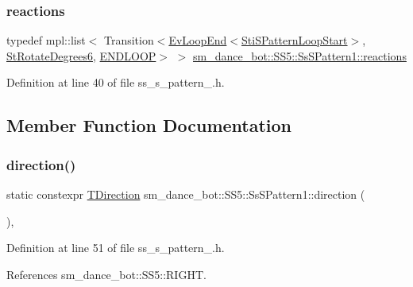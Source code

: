 \subsubsection{\texorpdfstring{reactions}{reactions}}
{\footnotesize\ttfamily typedef mpl\+::list$<$ Transition$<$\hyperlink{structsmacc_1_1default__events_1_1EvLoopEnd}{Ev\+Loop\+End}$<$\hyperlink{structsm__dance__bot_1_1s__pattern__states_1_1StiSPatternLoopStart}{Sti\+S\+Pattern\+Loop\+Start}$>$, \hyperlink{structsm__dance__bot_1_1StRotateDegrees6}{St\+Rotate\+Degrees6}, \hyperlink{structsmacc_1_1default__transition__tags_1_1ENDLOOP}{E\+N\+D\+L\+O\+OP}$>$ $>$ \hyperlink{structsm__dance__bot_1_1SS5_1_1SsSPattern1_a6c5b86a52543caf627a571c543f6eda8}{sm\+\_\+dance\+\_\+bot\+::\+S\+S5\+::\+Ss\+S\+Pattern1\+::reactions}}



Definition at line 40 of file ss\+\_\+s\+\_\+pattern\+\_.\+h.



\subsection{Member Function Documentation}
\mbox{\label{structsm__dance__bot_1_1SS5_1_1SsSPattern1_abe6ab6e7e6630e67566c0fee58ce565f}} 
\subsubsection{\texorpdfstring{direction()}{direction()}}
{\footnotesize\ttfamily static constexpr \hyperlink{namespacesm__dance__bot_1_1SS5_aaa01c87b9245bbff2b581cefd6f3b346}{T\+Direction} sm\+\_\+dance\+\_\+bot\+::\+S\+S5\+::\+Ss\+S\+Pattern1\+::direction (\begin{DoxyParamCaption}{ }\end{DoxyParamCaption})\hspace{0.3cm}{\ttfamily [inline]}, {\ttfamily [static]}}



Definition at line 51 of file ss\+\_\+s\+\_\+pattern\+\_.\+h.



References sm\+\_\+dance\+\_\+bot\+::\+S\+S5\+::\+R\+I\+G\+HT.


